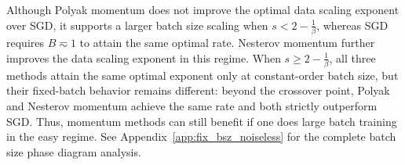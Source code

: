 \documentclass[11pt]{article}
\begin{document}
\begin{remark}
Although Polyak momentum does not improve the optimal data scaling exponent over SGD, it supports a larger batch size scaling when \(s<2-\frac{1}{\beta}\), whereas SGD requires \(B\eqsim 1\) to attain the same optimal rate. Nesterov momentum further improves the data scaling exponent in this regime. When \(s\geq 2-\frac{1}{\beta}\), all three methods attain the same optimal exponent only at constant-order batch size, but their fixed-batch behavior remains different: beyond the crossover point, Polyak and Nesterov momentum achieve the same rate and both strictly outperform SGD. Thus, momentum methods can still benefit if one does large batch training in the easy regime. See Appendix~\ref{app:fix_bsz_noiseless} for the complete batch size phase diagram analysis.
\end{remark}
\end{document}
